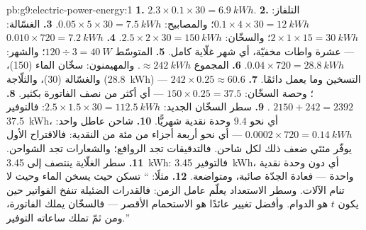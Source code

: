 \begin{solution}{pb:g9:electric-power-energy:1}
\textbf{1.} $2.3 \times 0.1 \times 30 = \qty{6.9}{kWh}$.
\textbf{2.} التلفاز: $0.1 \times 4 \times 30 =
\qty{12}{kWh}$؛ والمصابيح: $0.05 \times 5 \times 30 =
\qty{7.5}{kWh}$.
\textbf{3.} الغسّالة: $2 \times 1 \times 15 = \qty{30}{kWh}$؛
والسخّان: $2.5 \times 2 \times 30 = \qty{150}{kWh}$.
\textbf{4.} $0.010 \times 720 = \qty{7.2}{kWh}$ --- عشرة
واطات مخفيّة، أي شهر غلّاية كامل.
\textbf{5.} المتوسّط $120 \div 3 = \qty{40}{W}$؛ والشهر:
$0.04 \times 720 = \qty{28.8}{kWh}$.
\textbf{6.} المجموع $\approx \qty{242}{kWh}$. والمهيمنون:
سخّان الماء (\qty{150}{})، والغسّالة (\qty{30}{})، والثلّاجة
(\qty{28.8}{kWh}) --- التسخين وما يعمل دائمًا.
\textbf{7.} $242 \times 0.25 \approx 60.6$ ؛ وحصة
السخّان: $150 \times 0.25 = 37.5$ --- أي أكثر من نصف
الفاتورة بكثير.
\textbf{8.} $2150 + 242 = 2392$ .
\textbf{9.} سطر السخّان الجديد: $2.5 \times 1.5 \times 30 =
\qty{112.5}{kWh}$: فالتوفير \qty{37.5}{kWh}، أي نحو $9.4$
وحدة نقدية شهريًّا.
\textbf{10.} شاحن عاطل واحد: $0.0002 \times 720 =
\qty{0.14}{kWh}$ --- أي نحو أربعة أجزاء من مئة من 
النقدية: فالاقتراح الأول يوفّر مئتَي ضعف ذلك لكل شاحن.
فالتدقيقات تجد الروافع؛ والشعارات تجد الشواحن.
\textbf{11.} سطر الغلّاية ينتصف إلى \qty{3.45}{kWh}:
فالتوفير \qty{3.45}{kWh}، أي دون وحدة نقدية واحدة ---
فعادة الجدّة صائبة، ومتواضعة.
\textbf{12.} مثلًا: `` تسكن حيث يسخن الماء
وحيث لا تنام الآلات. وسطر الاستعداد يعلّم عامل الزمن: فالقدرات
الضئيلة تنفخ الفواتير حين يكون $t$ هو الدوام. وأفضل تغيير
عائدًا هو الاستحمام الأقصر --- فالسخّان يملك الفاتورة، ومن ثمّ
تملك ساعاته التوفير.''
\end{solution}
